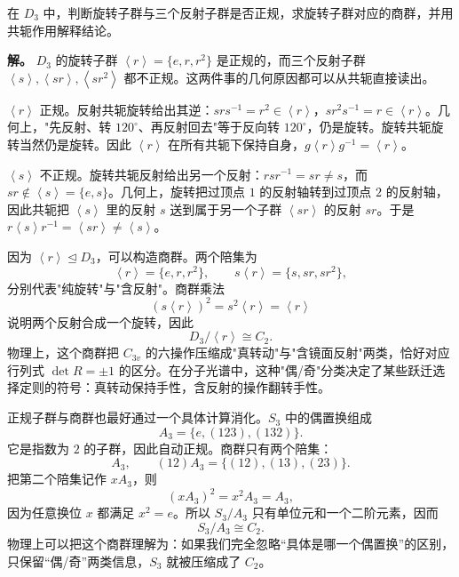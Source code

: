 \begin{example}
\label{ex:d3-normal-subgroup-geometry}
在 $D_3$ 中，判断旋转子群与三个反射子群是否正规，求旋转子群对应的商群，并用共轭作用解释结论。

\textbf{解。} $D_3$ 的旋转子群 $\left\langle r\right\rangle=\{e,r,r^2\}$ 是正规的，而三个反射子群 $\left\langle s\right\rangle,\left\langle sr\right\rangle,\left\langle sr^2\right\rangle$ 都不正规。这两件事的几何原因都可以从共轭直接读出。

$\left\langle r\right\rangle$ 正规。反射共轭旋转给出其逆：$srs^{-1}=r^2\in\left\langle r\right\rangle$，$sr^2s^{-1}=r\in\left\langle r\right\rangle$。几何上，"先反射、转 $120^\circ$、再反射回去"等于反向转 $120^\circ$，仍是旋转。旋转共轭旋转当然仍是旋转。因此 $\left\langle r\right\rangle$ 在所有共轭下保持自身，$g\left\langle r\right\rangle g^{-1}=\left\langle r\right\rangle$。

$\left\langle s\right\rangle$ 不正规。旋转共轭反射给出另一个反射：$rsr^{-1}=sr\neq s$，而 $sr\notin\left\langle s\right\rangle=\{e,s\}$。几何上，旋转把过顶点 $1$ 的反射轴转到过顶点 $2$ 的反射轴，因此共轭把 $\left\langle s\right\rangle$ 里的反射 $s$ 送到属于另一个子群 $\left\langle sr\right\rangle$ 的反射 $sr$。于是 $r\left\langle s\right\rangle r^{-1}=\left\langle sr\right\rangle\neq\left\langle s\right\rangle$。

因为 $\left\langle r\right\rangle\mathrel{\trianglelefteq} D_3$，可以构造商群。两个陪集为
\[
\left\langle r\right\rangle=\{e,r,r^2\},
\qquad
s\left\langle r\right\rangle=\{s,sr,sr^2\},
\]
分别代表"纯旋转"与"含反射"。商群乘法
\[
(s\left\langle r\right\rangle)^2=s^2\left\langle r\right\rangle=\left\langle r\right\rangle
\]
说明两个反射合成一个旋转，因此
\[
D_3/\left\langle r\right\rangle\cong C_2.
\]
物理上，这个商群把 $C_{3v}$ 的六操作压缩成"真转动"与"含镜面反射"两类，恰好对应行列式 $\det R=\pm1$ 的区分。在分子光谱中，这种"偶/奇"分类决定了某些跃迁选择定则的符号：真转动保持手性，含反射的操作翻转手性。
\end{example}


正规子群与商群也最好通过一个具体计算消化。$S_3$ 中的偶置换组成
\[
A_3=\{e,(123),(132)\}.
\]
它是指数为 $2$ 的子群，因此自动正规。商群只有两个陪集：
\[
A_3,\qquad (12)A_3=\{(12),(13),(23)\}.
\]
把第二个陪集记作 $xA_3$，则
\[
(xA_3)^2=x^2A_3=A_3,
\]
因为任意换位 $x$ 都满足 $x^2=e$。所以 $S_3/A_3$ 只有单位元和一个二阶元素，因而
\[
S_3/A_3\cong C_2.
\]
物理上可以把这个商群理解为：如果我们完全忽略“具体是哪一个偶置换”的区别，只保留“偶/奇”两类信息，$S_3$ 就被压缩成了 $C_2$。


